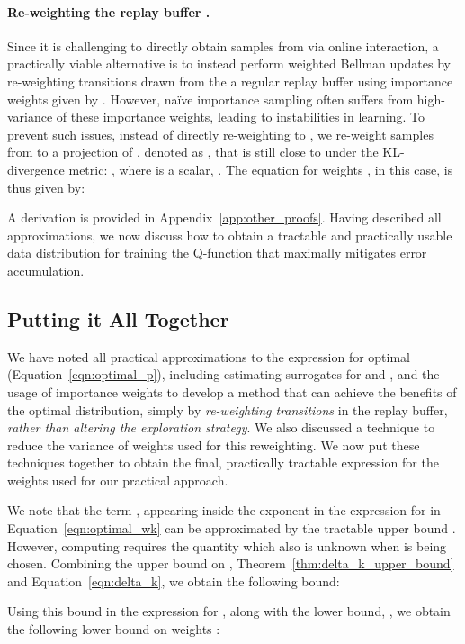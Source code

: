 \documentclass[jmlr]{article}
\begin{document}
\paragraph{Re-weighting the replay buffer .} Since it is challenging to directly obtain samples from  via online interaction, a practically viable alternative is to instead perform weighted Bellman updates by re-weighting transitions drawn from the a regular replay buffer  using importance weights given by . However, na\"ive importance sampling often suffers from high-variance of these importance weights, leading to instabilities in learning. To prevent such issues, instead of directly re-weighting to , we re-weight samples from  to a projection of , denoted as , that is still close to  under the KL-divergence metric: , where  is a scalar, .
The equation for weights , in this case, is thus given by:

A derivation is provided in Appendix~\ref{app:other_proofs}.
Having described all approximations, we now discuss how to obtain a tractable and practically usable data distribution for training the Q-function that maximally mitigates error accumulation.

\subsection{Putting it All Together}
\label{sec:putting_all}
We have noted all practical approximations to the expression for optimal  (Equation~\ref{eqn:optimal_p}), including estimating surrogates for  and , and the usage of importance weights to develop a method that can achieve the benefits of the optimal distribution, simply by \textit{re-weighting transitions} in the replay buffer, \textit{rather than altering the exploration strategy}. We also discussed a technique to reduce the variance of weights used for this reweighting. We now put these techniques together to obtain the final, practically tractable expression for the weights used for our practical approach.

We note that the term , appearing inside the exponent in the expression for  in Equation~\ref{eqn:optimal_wk} can be approximated by the tractable upper bound . However, computing  requires the quantity  which also is unknown when  is being chosen. Combining the upper bound on , Theorem~\ref{thm:delta_k_upper_bound} and Equation~\ref{eqn:delta_k}, we obtain the following bound:

Using this bound in the expression for , along with the lower bound, , we obtain the following lower bound on weights :
\end{document}
